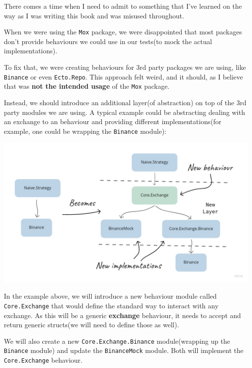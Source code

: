 \documentclass[
  oneside]{book}
\begin{document}
There comes a time when I need to admit to something that I've learned on the way as I was writing this book and was misused throughout.

When we were using the \texttt{Mox} package, we were disappointed that most packages don't provide behaviours we could use in our tests(to mock the actual implementations).

To fix that, we were creating behaviours for 3rd party packages we are using, like \texttt{Binance} or even \texttt{Ecto.Repo}. This approach felt weird, and it should, as I believe that was \textbf{not the intended usage} of the \texttt{Mox} package.

\newpage

Instead, we should introduce an additional layer(of abstraction) on top of the 3rd party modules we are using. A typical example could be abstracting dealing with an exchange to an behaviour and providing different implementations(for example, one could be wrapping the \texttt{Binance} module):

\begin{center}\includegraphics[width=1\linewidth]{images/chapter_21_01_additional_layer} \end{center}

In the example above, we will introduce a new behaviour module called \texttt{Core.Exchange} that would define the standard way to interact with any exchange. As this will be a generic \textbf{exchange} behaviour, it needs to accept and return generic structs(we will need to define those as well).

We will also create a new \texttt{Core.Exchange.Binance} module(wrapping up the \texttt{Binance} module) and update the \texttt{BinanceMock} module. Both will implement the \texttt{Core.Exchange} behaviour.
\end{document}
